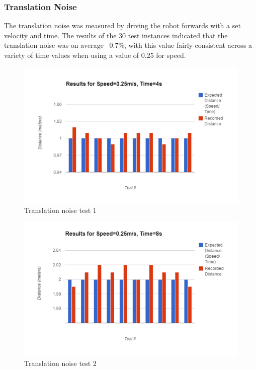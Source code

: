 \documentclass{article}
\begin{document}
\begin{multicols}{2}
	\subsubsection{Translation Noise}
	The translation noise was measured by driving the robot forwards with a set velocity and time. The results of the 30 test instances indicated that the translation noise was on average ~0.7\%, with this value fairly consistent across a variety of time values when using a value of 0.25 for speed.
	\begin{figure}[H]
	\centering
	\includegraphics[width=\linewidth]{ExperimentalResults1}
	\caption{Translation noise test 1}
	\end{figure}
	\begin{figure}[H]
	\centering
	\includegraphics[width=\linewidth]{ExperimentalResults2}
	\caption{Translation noise test 2}
	\end{figure}
	\begin{figure}[H]
	\centering

\end{figure}
\end{multicols}
\end{document}
